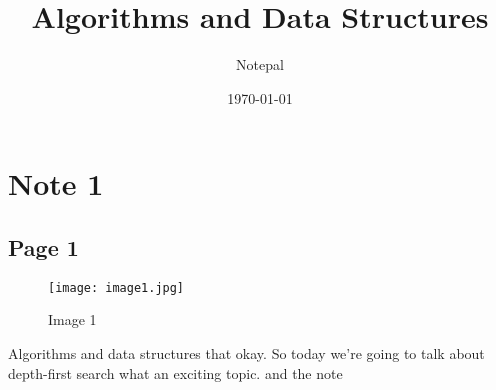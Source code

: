 \documentclass{article}%
\title{Algorithms and Data Structures}%
\author{Notepal}%
\date{\today}%
\begin{document}
%
\normalsize%
\maketitle%
\section{Note 1}%
\label{sec:Note 1}%
\subsection{Page 1}%
\label{subsec:Page 1}%


\begin{figure}[h!]%
\centering%
\texttt{[image: image1.jpg]}%
\caption{Image 1}%
\end{figure}

%
Algorithms and data structures that okay. So today we're going to talk about depth{-}first search what an exciting topic. \newline%
 and the note \newline%

%
\end{document}
